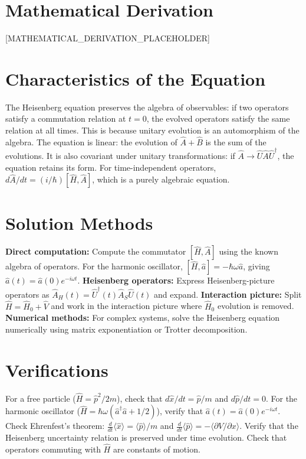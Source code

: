 \documentclass[11pt,openright]{book}
\begin{document}
\section*{Mathematical Derivation}

[MATHEMATICAL_DERIVATION_PLACEHOLDER]

\section*{Characteristics of the Equation}

The Heisenberg equation preserves the algebra of observables: if two operators satisfy a commutation relation at $t = 0$, the evolved operators satisfy the same relation at all times. This is because unitary evolution is an automorphism of the algebra. The equation is linear: the evolution of $\hat{A} + \hat{B}$ is the sum of the evolutions. It is also covariant under unitary transformations: if $\hat{A} \to \hat{U}\hat{A}\hat{U}^\dagger$, the equation retains its form. For time-independent operators, $d\hat{A}/dt = (i/\hbar)[\hat{H}, \hat{A}]$, which is a purely algebraic equation.
\section*{Solution Methods}

\textbf{Direct computation:} Compute the commutator $[\hat{H}, \hat{A}]$ using the known algebra of operators. For the harmonic oscillator, $[\hat{H}, \hat{a}] = -\hbar\omega\hat{a}$, giving $\hat{a}(t) = \hat{a}(0)e^{-i\omega t}$. \textbf{Heisenberg operators:} Express Heisenberg-picture operators as $\hat{A}_H(t) = \hat{U}^\dagger(t)\hat{A}_S\hat{U}(t)$ and expand. \textbf{Interaction picture:} Split $\hat{H} = \hat{H}_0 + \hat{V}$ and work in the interaction picture where $\hat{H}_0$ evolution is removed. \textbf{Numerical methods:} For complex systems, solve the Heisenberg equation numerically using matrix exponentiation or Trotter decomposition.
\section*{Verifications}

For a free particle ($\hat{H} = \hat{p}^2/2m$), check that $d\hat{x}/dt = \hat{p}/m$ and $d\hat{p}/dt = 0$. For the harmonic oscillator ($\hat{H} = \hbar\omega(\hat{a}^\dagger\hat{a} + 1/2)$), verify that $\hat{a}(t) = \hat{a}(0)e^{-i\omega t}$. Check Ehrenfest's theorem: $\frac{d}{dt}\langle\hat{x}\rangle = \langle\hat{p}\rangle/m$ and $\frac{d}{dt}\langle\hat{p}\rangle = -\langle\partial V/\partial x\rangle$. Verify that the Heisenberg uncertainty relation is preserved under time evolution. Check that operators commuting with $\hat{H}$ are constants of motion.
\end{document}
